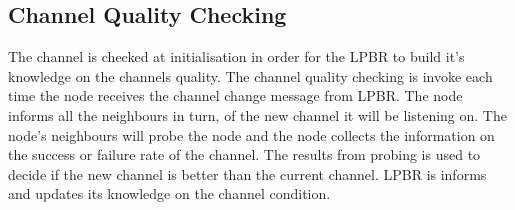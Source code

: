 


\subsection{Channel Quality Checking}

The channel is checked at initialisation in order for the LPBR to build it's knowledge on the channels quality. The channel quality checking is invoke each time the node receives the channel change message from LPBR. The node informs all the neighbours in turn, of the new channel it will be listening on. The node's neighbours will probe the node and the node collects the information on the success or failure rate of the channel. The results from probing is used to decide if the new channel is better than the current channel. LPBR is informs and updates its knowledge on the channel condition. 



